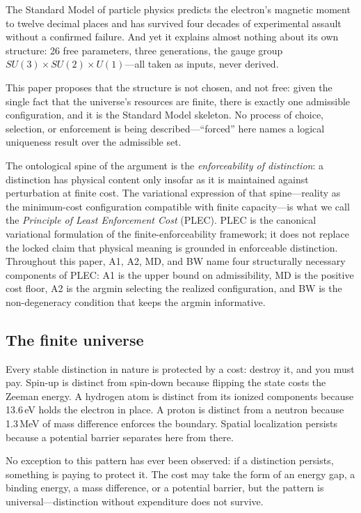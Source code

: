 \documentclass[11pt]{article}
\theoremstyle{remark}
\begin{document}
The Standard Model of particle physics predicts the electron's magnetic moment to twelve decimal places and has survived four decades of experimental assault without a confirmed failure.  And yet it explains almost nothing about its own structure: 26 free parameters, three generations, the gauge group $SU(3) \times SU(2) \times U(1)$---all taken as inputs, never derived.

This paper proposes that the structure is not chosen, and not free: given the single fact that the universe's resources are finite, there is exactly one admissible configuration, and it is the Standard Model skeleton.  No process of choice, selection, or enforcement is being described---``forced'' here names a logical uniqueness result over the admissible set.

The ontological spine of the argument is the \emph{enforceability of distinction}: a distinction has physical content only insofar as it is maintained against perturbation at finite cost.  The variational expression of that spine---reality as the minimum-cost configuration compatible with finite capacity---is what we call the \emph{Principle of Least Enforcement Cost} (PLEC).  PLEC is the canonical variational formulation of the finite-enforceability framework; it does not replace the locked claim that physical meaning is grounded in enforceable distinction.  Throughout this paper, A1, A2, MD, and BW name four structurally necessary components of PLEC: A1 is the upper bound on admissibility, MD is the positive cost floor, A2 is the argmin selecting the realized configuration, and BW is the non-degeneracy condition that keeps the argmin informative.

\subsection{The finite universe}

Every stable distinction in nature is protected by a cost: destroy it, and you must pay.  Spin-up is distinct from spin-down because flipping the state costs the Zeeman energy.  A hydrogen atom is distinct from its ionized components because 13.6\,eV holds the electron in place.  A proton is distinct from a neutron because 1.3\,MeV of mass difference enforces the boundary.  Spatial localization persists because a potential barrier separates here from there.

No exception to this pattern has ever been observed: if a distinction persists, something is paying to protect it.  The cost may take the form of an energy gap, a binding energy, a mass difference, or a potential barrier, but the pattern is universal---distinction without expenditure does not survive.
\end{document}
